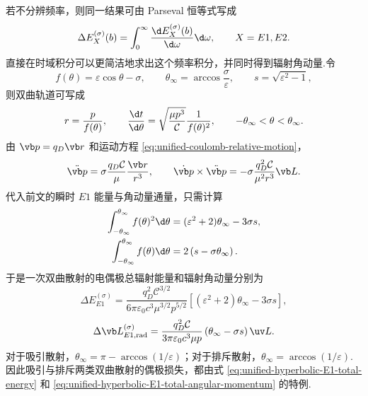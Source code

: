 若不分辨频率，则同一结果可由 Parseval 恒等式写成
\begin{equation}
 \Delta E_X^{(\sigma)}(b)
 =\int_0^\infty\frac{\d E_X^{(\sigma)}(b)}{\d\omega}\d\omega,
 \qquad X=E1,E2.
 \label{eq:total-loss-as-spectrum-integral}
\end{equation}
直接在时域积分可以更简洁地求出这个频率积分，并同时得到辐射角动量.令
\begin{equation}
 f(\theta)=\varepsilon\cos\theta-\sigma,
 \qquad
 \theta_\infty=\arccos\frac{\sigma}{\varepsilon},
 \qquad
 s=\sqrt{\varepsilon^2-1},
 \label{eq:hyperbolic-asymptotic-angle}
\end{equation}
则双曲轨道可写成
\begin{equation}
 r=\frac{p}{f(\theta)},
 \qquad
 \frac{\d t}{\d\theta}
 =\sqrt{\frac{\mu p^3}{\mathcal C}}\frac{1}{f(\theta)^2},
 \qquad
 -\theta_\infty<\theta<\theta_\infty.
 \label{eq:hyperbolic-polar-time-parametrization}
\end{equation}
由 $\vb p=q_D\vb r$ 和运动方程 \eqref{eq:unified-coulomb-relative-motion}，
\begin{equation}
 \ddot{\vb p}
 =\sigma\frac{q_D\mathcal C}{\mu}\frac{\vb r}{r^3},
 \qquad
 \dot{\vb p}\times\ddot{\vb p}
 =-\sigma\frac{q_D^2\mathcal C}{\mu^2r^3}\vb L.
 \label{eq:dipole-time-domain-coulomb-invariants}
\end{equation}
代入前文的瞬时 $E1$ 能量与角动量通量，只需计算
\begin{equation}
 \begin{aligned}
 \int_{-\theta_\infty}^{\theta_\infty}f(\theta)^2\d\theta
 &=(\varepsilon^2+2)\theta_\infty-3\sigma s,\\
 \int_{-\theta_\infty}^{\theta_\infty}f(\theta)\d\theta
 &=2\left(s-\sigma\theta_\infty\right).
 \end{aligned}
 \label{eq:dipole-hyperbolic-elementary-integrals}
\end{equation}
于是一次双曲散射的电偶极总辐射能量和辐射角动量分别为
\begin{equation}
 \Delta E_{E1}^{(\sigma)}
 =\frac{q_D^2\mathcal C^{3/2}}
 {6\pi\varepsilon_0c^3\mu^{3/2}p^{5/2}}
 \left[(\varepsilon^2+2)\theta_\infty-3\sigma s\right],
 \label{eq:unified-hyperbolic-E1-total-energy}
\end{equation}
\begin{equation}
 \Delta\vb L_{E1,\mathrm{rad}}^{(\sigma)}
 =\frac{q_D^2\mathcal C}
 {3\pi\varepsilon_0c^3\mu p}
 \left(\theta_\infty-\sigma s\right)\uv L.
 \label{eq:unified-hyperbolic-E1-total-angular-momentum}
\end{equation}
对于吸引散射，$\theta_\infty=\pi-\arccos(1/\varepsilon)$；对于排斥散射，$\theta_\infty=\arccos(1/\varepsilon)$.因此吸引与排斥两类双曲散射的偶极损失，都由式 \eqref{eq:unified-hyperbolic-E1-total-energy} 和 \eqref{eq:unified-hyperbolic-E1-total-angular-momentum} 的特例.

